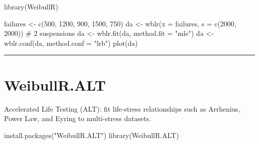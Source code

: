 \documentclass[
  letterpaper,
  DIV=11,
  numbers=noendperiod]{scrreprt}
\newenvironment{Shaded}{\begin{snugshade}}{\end{snugshade}}
\newcommand{\AttributeTok}[1]{\textcolor[rgb]{0.40,0.45,0.13}{#1}}
\newcommand{\CommentTok}[1]{\textcolor[rgb]{0.37,0.37,0.37}{#1}}
\newcommand{\DecValTok}[1]{\textcolor[rgb]{0.68,0.00,0.00}{#1}}
\newcommand{\FunctionTok}[1]{\textcolor[rgb]{0.28,0.35,0.67}{#1}}
\newcommand{\NormalTok}[1]{\textcolor[rgb]{0.00,0.23,0.31}{#1}}
\newcommand{\OtherTok}[1]{\textcolor[rgb]{0.00,0.23,0.31}{#1}}
\newcommand{\StringTok}[1]{\textcolor[rgb]{0.13,0.47,0.30}{#1}}
\begin{document}
\begin{Shaded}
\begin{Highlighting}[]
\FunctionTok{library}\NormalTok{(WeibullR)}

\NormalTok{failures }\OtherTok{\textless{}{-}} \FunctionTok{c}\NormalTok{(}\DecValTok{500}\NormalTok{, }\DecValTok{1200}\NormalTok{, }\DecValTok{900}\NormalTok{, }\DecValTok{1500}\NormalTok{, }\DecValTok{750}\NormalTok{)}
\NormalTok{da }\OtherTok{\textless{}{-}} \FunctionTok{wblr}\NormalTok{(}\AttributeTok{x =}\NormalTok{ failures, }\AttributeTok{s =} \FunctionTok{c}\NormalTok{(}\DecValTok{2000}\NormalTok{, }\DecValTok{2000}\NormalTok{))  }\CommentTok{\# 2 suspensions}
\NormalTok{da }\OtherTok{\textless{}{-}} \FunctionTok{wblr.fit}\NormalTok{(da, }\AttributeTok{method.fit =} \StringTok{"mle"}\NormalTok{)}
\NormalTok{da }\OtherTok{\textless{}{-}} \FunctionTok{wblr.conf}\NormalTok{(da, }\AttributeTok{method.conf =} \StringTok{"lrb"}\NormalTok{)}
\FunctionTok{plot}\NormalTok{(da)}
\end{Highlighting}
\end{Shaded}

\begin{center}\rule{0.5\linewidth}{0.5pt}\end{center}

\section*{WeibullR.ALT}\label{weibullr.alt}


Accelerated Life Testing (ALT): fit life-stress relationships such as
Arrhenius, Power Law, and Eyring to multi-stress datasets.

\begin{Shaded}
\begin{Highlighting}[]
\FunctionTok{install.packages}\NormalTok{(}\StringTok{"WeibullR.ALT"}\NormalTok{)}
\FunctionTok{library}\NormalTok{(WeibullR.ALT)}
\end{Highlighting}
\end{Shaded}
\end{document}
